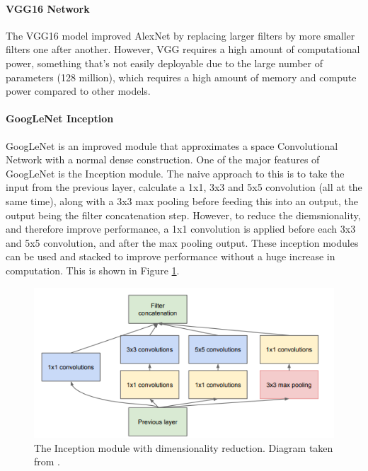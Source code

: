\documentclass[10pt,a4paper]{article}
\begin{document}
        \paragraph{VGG16 Network}
        The VGG16 model improved AlexNet by replacing larger filters by more smaller filters one after another.
        However, VGG requires a high amount of computational power, something that's not easily deployable due to
        the large number of parameters (128 million), which requires a high amount of memory and compute power compared
        to other models. \cite{DeepNeuralNetworkDeployability}

        \paragraph{GoogLeNet Inception}
        GoogLeNet is an improved module that approximates a space Convolutional Network with a normal
        dense construction. One of the major features of GoogLeNet is the Inception module. The naive approach to this 
        is to take the input from the previous layer, calculate a 1x1, 3x3 and 5x5 convolution (all at the same time), along with
        a 3x3 max pooling before feeding this into an output, the output being the filter concatenation step.
        However, to reduce the diemsnionality, and therefore improve performance, a 1x1 convolution is applied before
        each 3x3 and 5x5 convolution, and after the max pooling output. These inception modules can be used and stacked
        to improve performance without a huge increase in computation. \cite{GoogLeNet} 
        This is shown in Figure \ref{InceptionArchitecture}.

        \begin{figure}
            \centering
            \includegraphics[width=0.7\linewidth]{InceptionModule.png}
            \caption{The Inception module with dimensionality reduction. Diagram taken from \cite{GoogLeNet}.}
            \label{InceptionArchitecture}
        \end{figure}
\end{document}
